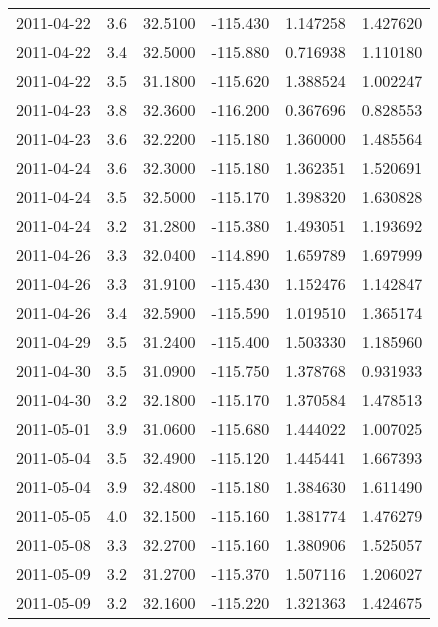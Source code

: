 \begin{tabular}{lrrrrr}
2011-04-22 &       3.6 &  32.5100 &  -115.430 &         1.147258 &         1.427620 \\
2011-04-22 &       3.4 &  32.5000 &  -115.880 &         0.716938 &         1.110180 \\
2011-04-22 &       3.5 &  31.1800 &  -115.620 &         1.388524 &         1.002247 \\
2011-04-23 &       3.8 &  32.3600 &  -116.200 &         0.367696 &         0.828553 \\
2011-04-23 &       3.6 &  32.2200 &  -115.180 &         1.360000 &         1.485564 \\
2011-04-24 &       3.6 &  32.3000 &  -115.180 &         1.362351 &         1.520691 \\
2011-04-24 &       3.5 &  32.5000 &  -115.170 &         1.398320 &         1.630828 \\
2011-04-24 &       3.2 &  31.2800 &  -115.380 &         1.493051 &         1.193692 \\
2011-04-26 &       3.3 &  32.0400 &  -114.890 &         1.659789 &         1.697999 \\
2011-04-26 &       3.3 &  31.9100 &  -115.430 &         1.152476 &         1.142847 \\
2011-04-26 &       3.4 &  32.5900 &  -115.590 &         1.019510 &         1.365174 \\
2011-04-29 &       3.5 &  31.2400 &  -115.400 &         1.503330 &         1.185960 \\
2011-04-30 &       3.5 &  31.0900 &  -115.750 &         1.378768 &         0.931933 \\
2011-04-30 &       3.2 &  32.1800 &  -115.170 &         1.370584 &         1.478513 \\
2011-05-01 &       3.9 &  31.0600 &  -115.680 &         1.444022 &         1.007025 \\
2011-05-04 &       3.5 &  32.4900 &  -115.120 &         1.445441 &         1.667393 \\
2011-05-04 &       3.9 &  32.4800 &  -115.180 &         1.384630 &         1.611490 \\
2011-05-05 &       4.0 &  32.1500 &  -115.160 &         1.381774 &         1.476279 \\
2011-05-08 &       3.3 &  32.2700 &  -115.160 &         1.380906 &         1.525057 \\
2011-05-09 &       3.2 &  31.2700 &  -115.370 &         1.507116 &         1.206027 \\
2011-05-09 &       3.2 &  32.1600 &  -115.220 &         1.321363 &         1.424675 \\

\end{tabular}
